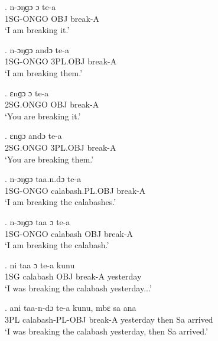 \documentclass{assets/fieldnotes}
\begin{document}
\exg.
n-ɔŋɡɔ     ɔ     te-a    \\
1SG-ONGO   OBJ   break-A \\%
`I am breaking it.'

\exg.
n-ɔŋɡɔ     andɔ      te-a    \\
1SG-ONGO   3PL.OBJ   break-A \\%
`I am breaking them.'

\exg.
ɛnɡɔ       ɔ     te-a    \\
2SG.ONGO   OBJ   break-A \\%
`You are breaking it.'

\exg.
ɛnɡɔ       andɔ      te-a    \\
2SG.ONGO   3PL.OBJ   break-A \\%
`You are breaking them.'

\exg.
n-ɔŋɡɔ     taa.n.dɔ          te-a    \\
1SG-ONGO   calabash.PL.OBJ   break-A \\%
`I am breaking the calabashes.'

\exg.
n-ɔŋɡɔ     taa        ɔ     te-a    \\
1SG-ONGO   calabash   OBJ   break-A \\%
`I am breaking the calabash.'

\exg.
ni    taa        ɔ     te-a      kunu      \\
1SG   calabash   OBJ   break-A   yesterday \\%
`I was breaking the calabash yesterday...'

\exg.
ani   taa-n-dɔ          te-a      kunu,       mbɛ    sa   ana     \\
3PL   calabash-PL-OBJ   break-A   yesterday   then   Sa   arrived \\%
`I was breaking the calabash yesterday, then Sa arrived.'


\end{document}
